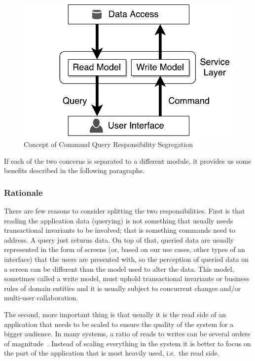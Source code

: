 \documentclass{book}
\begin{document}
\begin{figure}[h!]
\begin{center}
\includegraphics[width=0.7\columnwidth]{figures/cqrs-concept/cqrs-concept}
\caption{Concept of Command Query Responsibility Segregation%
}
\end{center}
\end{figure}

If each of the two concerns is separated to a different module, it
provides us some benefits described in the following paragraphs.

\subsubsection{Rationale}\label{rationale}

There are few reasons to consider splitting the two responsibilities.
First is that reading the application data (querying) is not something
that usually needs transactional invariants to be involved; that is
something commands need to address. A query just returns data. On top of
that, queried data are usually represented in the form of screens (or,
based on our use cases, other types of an interface) that the users are
presented with, so the perception of queried data on a screen can be
different than the model used to alter the data. This model, sometimes
called a write model, must uphold transactional invariants or business
rules of domain entities and it is usually subject to concurrent changes
and/or multi-user collaboration.

The second, more important thing is that usually it is the read side of
an application that needs to be scaled to ensure the quality of the
system for a bigger audience. In many systems, a ratio of reads to
writes can be several orders of magnitude~\cite{cap}. Instead of scaling
everything in the system it is better to focus on the part of the
application that is most heavily used, i.e.~the read side.
\end{document}
